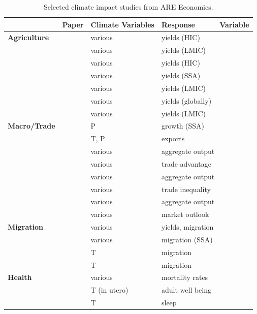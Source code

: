 \documentclass[a4paper,12pt]{article}
\theoremstyle{plain}
\theoremstyle{definition}
\theoremstyle{definition}
\theoremstyle{definition}
\theoremstyle{definition}
\begin{document}
\begin{table}[t!]
    \singlespacing
    \centering
    \caption{Selected climate impact studies from ARE Economics.}
    \begin{tabular}{|p{2.8cm}|p{6cm}|p{2.2cm}|p{3.5cm}| }
    \hline
    & \raggedright\textbf{Paper} & \textbf{Climate Variables} & \textbf{Response\ \ \ \ \ \ Variable} \\
    \hline    
    \textbf{Agriculture} & \citet{Deschenes2007} & various & yields (HIC)\\
    \ \ & \citet{Mendelsohn2008} & various & yields (LMIC)\\
    \ \ & \citet{Schlenker2009} & various & yields (HIC)\\
    \ \ & \citet{Schlenker2010} & various & yields (SSA)\\
    \ \ & \citet{Welch2010} & various & yields (LMIC)\\
    \ \ & \citet{Lobell2011}& various & yields (globally)\\
    \ \ & \citet{Hertel2014} & various & yields (LMIC)\\
    \hline
    \textbf{Macro/Trade} & \citet{Barrios2010} & P & growth (SSA)\\
    \ \ & \citet{Jones2010} & T, P & exports\\
    \ \ & \citet{Burke2015}& various & aggregate output\\
    \ \ & \citet{Costinot2016} & various & trade advantage\\
    \ \ & \citet{Deryugina2017}& various & aggregate output\\
    \ \ & \citet{Dingel2019} & various & trade inequality\\
    \ \ & \citet{Burke2019}& various & aggregate output\\
    \ \ & \citet{Schlenker2019} & various & market outlook\\
    \hline
    \textbf{Migration} & \citet{Feng2010}& various & yields, migration\\
    \ \ & \citet{Marchiori2012}& various & migration (SSA)\\
    \ \ & \citet{Cattaneo2016}& T & migration\\
    \ \ & \citet{Missirian2017}& T & migration\\    
    \hline
    \textbf{Health} & \citet{Deschenes2014} & various & mortality rates\\
    \ \ & \citet{Isen2017} & T (in utero) & adult well being\\
    \ \ & \citet{Obradovich2017} & T & sleep\\

\end{tabular}
\end{table}
\end{document}
